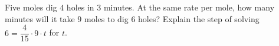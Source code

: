 Five moles dig $4$ holes in $3$ minutes. At the same rate per mole, how many minutes will it take $9$ moles to dig $6$ holes? Explain the step of solving $6=\dfrac{4}{15}\cdot9\cdot t$ for $t$.
